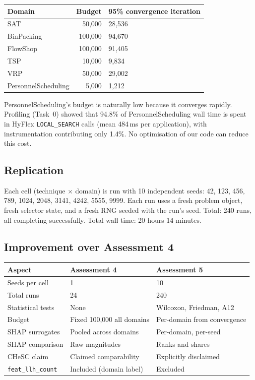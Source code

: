 \documentclass[11pt,a4paper]{article}
\begin{document}
\begin{table}[H]
\centering
\begin{tabular}{lrl}
\toprule
Domain & Budget & 95\% convergence iteration \\
\midrule
SAT & 50{,}000 & 28{,}536 \\
BinPacking & 100{,}000 & 94{,}670 \\
FlowShop & 100{,}000 & 91{,}405 \\
TSP & 10{,}000 & 9{,}834 \\
VRP & 50{,}000 & 29{,}002 \\
PersonnelScheduling & 5{,}000 & 1{,}212 \\
\bottomrule
\end{tabular}
\end{table}

PersonnelScheduling's budget is naturally low because it converges rapidly. Profiling
(Task~0) showed that 94.8\% of PersonnelScheduling wall time is spent in HyFlex
\texttt{LOCAL\_SEARCH} calls (mean 484\,ms per application), with instrumentation
contributing only 1.4\%. No optimisation of our code can reduce this cost.

\subsection{Replication}

Each cell (technique $\times$ domain) is run with 10 independent seeds: 42, 123, 456,
789, 1024, 2048, 3141, 4242, 5555, 9999. Each run uses a fresh problem object, fresh
selector state, and a fresh RNG seeded with the run's seed. Total: 240 runs, all
completing successfully. Total wall time: 20 hours 14 minutes.

\subsection{Improvement over Assessment 4}

\begin{table}[H]
\centering
\begin{tabular}{lll}
\toprule
Aspect & Assessment 4 & Assessment 5 \\
\midrule
Seeds per cell & 1 & 10 \\
Total runs & 24 & 240 \\
Statistical tests & None & Wilcoxon, Friedman, A12 \\
Budget & Fixed 100{,}000 all domains & Per-domain from convergence \\
SHAP surrogates & Pooled across domains & Per-domain, per-seed \\
SHAP comparison & Raw magnitudes & Ranks and shares \\
CHeSC claim & Claimed comparability & Explicitly disclaimed \\
\texttt{feat\_llh\_count} & Included (domain label) & Excluded \\
\bottomrule
\end{tabular}
\end{table}
\end{document}
